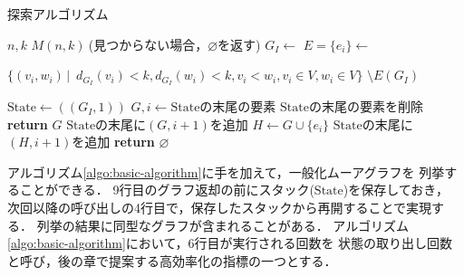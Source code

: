 \begin{algorithm}
  \caption{探索アルゴリズム}
  \label{algo:basic-algorithm}
  \begin{algorithmic}[1]
    \Require $n,k$
    \Ensure $M(n,k)\:$(見つからない場合，$\varnothing$を返す)
    \State $G_I\gets$
    \State $E=\{e_i\}\gets $\parbox[t]{\linewidth}{
      $\{(v_i,w_i)\,|$
      $\,d_{G_I}(v_i)<k,d_{G_I}(w_i)<k,v_i<w_i,v_i\in V,w_i\in V\}$
      $\setminus E(G_I)$
    }
    \State $\mathrm{State}\gets((G_I,1))$
    \State $G,i\gets\mathrm{State}$の末尾の要素
    \State $\mathrm{State}$の末尾の要素を削除
    \State \textbf{return} $G$
    \EndIf
    \State $\mathrm{State}$の末尾に$(G,i+1)$を追加
    \EndIf
    \State $H\gets G\cup\{e_i\}$
    \State $\mathrm{State}$の末尾に$(H,i+1)$を追加
    \EndIf
    \EndWhile
    \State \textbf{return} $\varnothing$
    \EndProcedure
  \end{algorithmic}
\end{algorithm}
アルゴリズム\ref{algo:basic-algorithm}に手を加えて，一般化ムーアグラフを
列挙することができる．
9行目のグラフ返却の前にスタック($\mathrm{State}$)を保存しておき，
次回以降の呼び出しの4行目で，保存したスタックから再開することで実現する．
列挙の結果に同型なグラフが含まれることがある．
アルゴリズム\ref{algo:basic-algorithm}において，6行目が実行される回数を
状態の取り出し回数と呼び，後の章で提案する高効率化の指標の一つとする．

